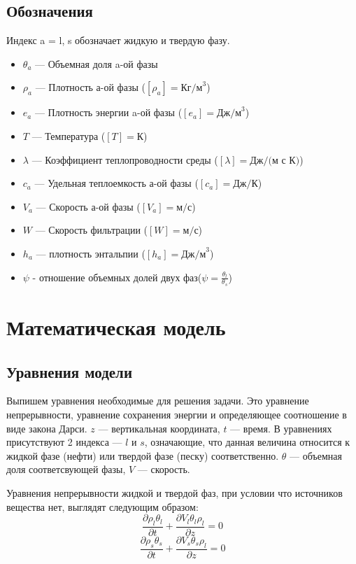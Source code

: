 \documentclass[12pt,a4paper]{article}
\newcommand{\pd}[2]{\frac{\partial #1}{\partial #2}}
\begin{document}
\subsection{Обозначения}
Индекс a  = l, s обозначает жидкую и твердую фазу.
\begin{itemize}
\item $\theta_a $ --- Объемная доля a-ой фазы
\item $\rho_a$ --- Плотность а-ой фазы ($[\rho_a] = \text{Кг/м}^3$)
\item $e_a$ --- Плотность энергии a-ой фазы ($[e_a] = \text{Дж/м}^3$)
\item $T $ --- Температура ($[T] =\text{К}$)
\item $\lambda$ --- Коэффициент теплопроводности среды ($[\lambda] = \text{Дж/(м с К)}$)
\item $c_a$ --- Удельная теплоемкость а-ой фазы ($[c_a] = \text{Дж/К}$)
\item $V_a$ --- Скорость а-ой фазы ($[V_a] = \text{м/с} $)
\item $W$ --- Скорость фильтрации ($[W] = \text{м/с} $)
\item $h_a$ --- плотность энтальпии ($[h_a] = \text{Дж/м}^3$)
\item $\psi$ - отношение объемных долей двух фаз($\psi = \frac{\theta_l}{\theta_s} $)
\end{itemize}


\newpage
\section{Математическая модель}
\subsection{Уравнения модели}
Выпишем уравнения необходимые для решения задачи. Это уравнение непрерывности, уравнение сохранения энергии и определяющее соотношение в виде закона Дарси.  $z$ --- вертикальная координата, $t$ --- время. В уравнениях присутствуют 2 индекса --- $ l $ и $ s$, означающие, что данная величина относится к жидкой фазе (нефти) или твердой фазе (песку) соответственно. $\theta$ --- объемная доля соответсвующей фазы, $ V $ --- скорость.

Уравнения непрерывности жидкой и твердой фаз, при условии что источников вещества нет, выглядят следующим образом:
\begin{equation}
\pd{\rho_l\theta_l}{t} + \pd{V_l\theta_l\rho_l}{z} =0
\label{eq:contin_l}
\end{equation}
\begin{equation}
\pd{\rho_s\theta_s}{t} + \pd{V_s\theta_s\rho_l}{z} =0
\label{eq:contin_s}
\end{equation}
\end{document}
